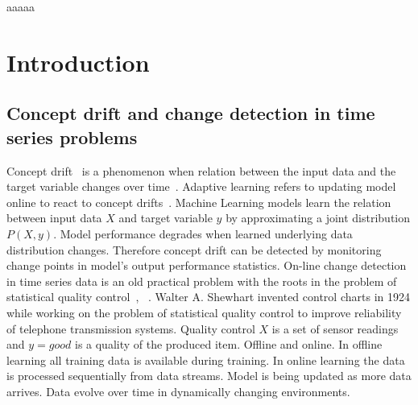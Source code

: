 \documentclass[licentiate,utf8,lot,loar,lof,shortloft,index]{jydiss}
\begin{document}
\preface
{} aaaaa
\acknowledgements

\mainmatter

\chapter{Introduction}
\section{Concept drift and change detection in time series problems}
Concept drift~\cite{schlimmer1986incremental,gama2014survey} is a
phenomenon when relation between the input data and the target variable changes
over time~\cite{gama2014survey}.
Adaptive learning refers to updating model online to react to concept
drifts~\cite{gama2014survey}.
Machine Learning models learn the relation between input data $X$ and target
variable $y$ by approximating a joint distribution $P(X,y)$.  Model performance
degrades when learned underlying data distribution changes.  Therefore concept
drift can be detected by monitoring change points in model's output performance
statistics.
On-line change detection in time series data is an old practical problem with
the roots in the problem of statistical quality
control~\cite{basseville1993detection}, ~\cite{NISTbook}.  Walter A. Shewhart
invented control charts in 1924 while working on the problem of statistical
quality control to improve reliability of telephone transmission systems.
Quality control
$X$ is a set of sensor readings and $y=good$ is a quality of the produced item.
Offline and online.
In offline learning all training data is available during training.
In online learning the data is processed sequentially from data streams.
Model is being updated as more data arrives.
Data evolve over time in dynamically changing environments.


\end{document}
